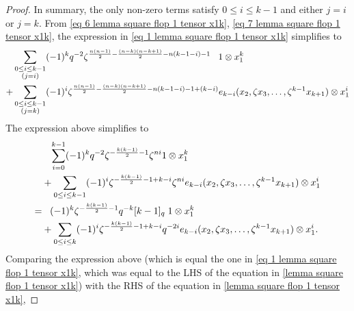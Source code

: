 \begin{proof}
    In summary, the only non-zero terms satisfy $0\leq i \leq k-1$ and either $j=i$ or $j=k$. From \eqref{eq 6 lemma square flop 1 tensor x1k}, \eqref{eq 7 lemma square flop 1 tensor x1k}, the expression in \eqref{eq 1 lemma square flop 1 tensor x1k} simplifies to
    \begin{align*}
        &\sum_{\substack{0\leq i \leq k-1\\(j=i)}} (-1)^{k}q^{-2} \zeta^{\frac{n(n-1)}{2}-\frac{(n-k)(n-k+1)}{2}-n(k-1-i)-1} \;\;\;1\otimes x_1^k\hspace{50 pt} 
        \\
        +&\sum_{\substack{0\leq i \leq k-1\\(j=k)}} (-1)^{i}\zeta^{\frac{n(n-1)}{2}-\frac{(n-k)(n-k+1)}{2}-n(k-1-i)-1+(k-i)}e_{k-i}(x_2, \zeta x_3, \ldots, \zeta^{k-1}x_{k+1})\otimes x_1^{i}
    \end{align*}
    The expression above simplifies to
    \begin{align}
       \notag  &\;\;\;\sum_{i=0}^{k-1} (-1)^kq^{-2}\zeta^{-\frac{k(k-1)}{2}-1}\zeta^{ni} 1\otimes x_1^k\\
     \notag   &+\sum_{0\leq i \leq k-1} (-1)^{i}\zeta^{-\frac{k(k-1)}{2}-1+k-i}
        \zeta^{ni}e_{k-i}(x_2, \zeta x_3, \ldots, \zeta^{k-1}x_{k+1})\otimes x_1^{i}\\
    =&\;\;\;\notag (-1)^k\zeta^{-\frac{k(k-1)}{2}-1}q^{-k}[k-1]_q\; 1\otimes x_1^k\\
    &+\sum_{0\leq i \leq k} (-1)^{i}\zeta^{-\frac{k(k-1)}{2}-1+k-i}
        q^{-2i} e_{k-i}(x_2, \zeta x_3, \ldots, \zeta^{k-1}x_{k+1})\otimes x_1^{i}. \label{eq 8 lemma square flop 1 tensor x1k}   
    \end{align}
    Comparing the expression above (which is equal the one in \eqref{eq 1 lemma square flop 1 tensor x1k}, which was equal to the LHS of the equation in \cref{lemma square flop 1 tensor x1k}) with the RHS of the equation in \cref{lemma square flop 1 tensor x1k},

\end{proof}
